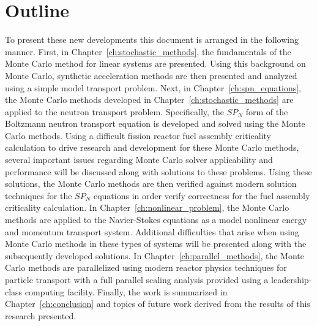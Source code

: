 \section{Outline}

To present these new developments this document is arranged in the
following manner. First, in Chapter~\ref{ch:stochastic_methods}, the
fundamentals of the Monte Carlo method for linear systems are
presented. Using this background on Monte Carlo, synthetic
acceleration methods are then presented and analyzed using a simple
model transport problem. Next, in Chapter~\ref{ch:spn_equations}, the
Monte Carlo methods developed in Chapter~\ref{ch:stochastic_methods}
are applied to the neutron transport problem. Specifically, the $SP_N$
form of the Boltzmann neutron transport equation is developed and
solved using the Monte Carlo methods. Using a difficult fission
reactor fuel assembly criticality calculation to drive research and
development for these Monte Carlo methods, several important issues
regarding Monte Carlo solver applicability and performance will be
discussed along with solutions to these problems. Using these
solutions, the Monte Carlo methods are then verified against modern
solution techniques for the $SP_N$ equations in order verify
correctness for the fuel assembly criticality calculation. In
Chapter~\ref{ch:nonlinear_problem}, the Monte Carlo methods are
applied to the Navier-Stokes equations as a model nonlinear energy and
momentum transport system. Additional difficulties that arise when
using Monte Carlo methods in these types of systems will be presented
along with the subsequently developed solutions. In
Chapter~\ref{ch:parallel_methods}, the Monte Carlo methods are
parallelized using modern reactor physics techniques for particle
transport with a full parallel scaling analysis provided using a
leadership-class computing facility. Finally, the work is summarized
in Chapter~\ref{ch:conclusion} and topics of future work derived from
the results of this research presented.
